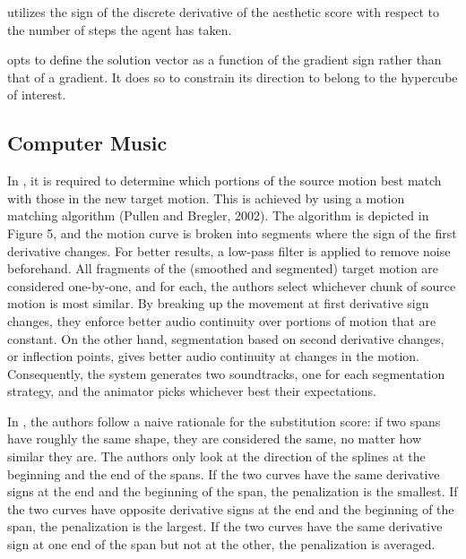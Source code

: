 \documentclass[11pt]{book}
\begin{document}
\cite{li2018a2} utilizes the sign of the discrete derivative of the
aesthetic score with respect to the number of steps the agent has
taken.

\cite{moosavi2019robustness} opts to define the solution vector as
a function of the gradient sign rather than that of a gradient. It
does so to constrain its direction to belong to the hypercube of interest.


\subsection{Computer Music}

In \cite{cardle2003sound}, it is required to determine which portions
of the source motion best match with those in the new target motion.
This is achieved by using a motion matching algorithm (Pullen and
Bregler, 2002). The algorithm is depicted in Figure 5, and the motion
curve is broken into segments where the sign of the first derivative
changes. For better results, a low-pass filter is applied to remove
noise beforehand. All fragments of the (smoothed and segmented) target
motion are considered one-by-one, and for each, the authors select
whichever chunk of source motion is most similar. By breaking up the
movement at first derivative sign changes, they enforce better audio
continuity over portions of motion that are constant. On the other
hand, segmentation based on second derivative changes, or inflection
points, gives better audio continuity at changes in the motion. Consequently,
the system generates two soundtracks, one for each segmentation strategy,
and the animator picks whichever best their expectations.

In \cite{urbano2012mirex}, the authors follow a naive rationale for
the substitution score: if two spans have roughly the same shape,
they are considered the same, no matter how similar they are. The
authors only look at the direction of the splines at the beginning
and the end of the spans. If the two curves have the same derivative
signs at the end and the beginning of the span, the penalization is
the smallest. If the two curves have opposite derivative signs at
the end and the beginning of the span, the penalization is the largest.
If the two curves have the same derivative sign at one end of the
span but not at the other, the penalization is averaged.
\end{document}
